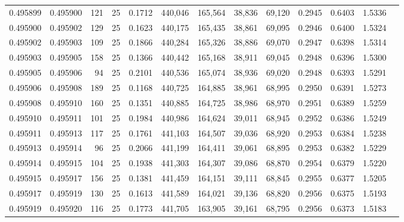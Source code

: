 \begin{tabular}{rrrrrrrrrrrrr}
0.495899 & 0.495900 &   121 &  25 &                                     0.1712 & 440,046 & 165,564 &  38,836 &  69,120 & 0.2945 & 0.6403 & 1.5336 \\
0.495900 & 0.495902 &   129 &  25 &                                     0.1623 & 440,175 & 165,435 &  38,861 &  69,095 & 0.2946 & 0.6400 & 1.5324 \\
0.495902 & 0.495903 &   109 &  25 &                                     0.1866 & 440,284 & 165,326 &  38,886 &  69,070 & 0.2947 & 0.6398 & 1.5314 \\
0.495903 & 0.495905 &   158 &  25 &                                     0.1366 & 440,442 & 165,168 &  38,911 &  69,045 & 0.2948 & 0.6396 & 1.5300 \\
0.495905 & 0.495906 &    94 &  25 &                                     0.2101 & 440,536 & 165,074 &  38,936 &  69,020 & 0.2948 & 0.6393 & 1.5291 \\
0.495906 & 0.495908 &   189 &  25 &                                     0.1168 & 440,725 & 164,885 &  38,961 &  68,995 & 0.2950 & 0.6391 & 1.5273 \\
0.495908 & 0.495910 &   160 &  25 &                                     0.1351 & 440,885 & 164,725 &  38,986 &  68,970 & 0.2951 & 0.6389 & 1.5259 \\
0.495910 & 0.495911 &   101 &  25 &                                     0.1984 & 440,986 & 164,624 &  39,011 &  68,945 & 0.2952 & 0.6386 & 1.5249 \\
0.495911 & 0.495913 &   117 &  25 &                                     0.1761 & 441,103 & 164,507 &  39,036 &  68,920 & 0.2953 & 0.6384 & 1.5238 \\
0.495913 & 0.495914 &    96 &  25 &                                     0.2066 & 441,199 & 164,411 &  39,061 &  68,895 & 0.2953 & 0.6382 & 1.5229 \\
0.495914 & 0.495915 &   104 &  25 &                                     0.1938 & 441,303 & 164,307 &  39,086 &  68,870 & 0.2954 & 0.6379 & 1.5220 \\
0.495915 & 0.495917 &   156 &  25 &                                     0.1381 & 441,459 & 164,151 &  39,111 &  68,845 & 0.2955 & 0.6377 & 1.5205 \\
0.495917 & 0.495919 &   130 &  25 &                                     0.1613 & 441,589 & 164,021 &  39,136 &  68,820 & 0.2956 & 0.6375 & 1.5193 \\
0.495919 & 0.495920 &   116 &  25 &                                     0.1773 & 441,705 & 163,905 &  39,161 &  68,795 & 0.2956 & 0.6373 & 1.5183 \\

\end{tabular}
